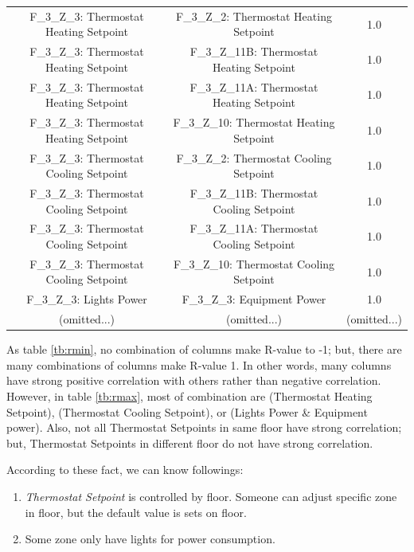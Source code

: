 \documentclass[aps, 10pt, a4paper]{article}
\begin{document}
\begin{table}[htbp]
\begin{tabular}{c|c||c}
                        F\_3\_Z\_3: Thermostat Heating Setpoint & F\_3\_Z\_2: Thermostat Heating Setpoint & 1.0 \\
                        F\_3\_Z\_3: Thermostat Heating Setpoint & F\_3\_Z\_11B: Thermostat Heating Setpoint & 1.0 \\
                        F\_3\_Z\_3: Thermostat Heating Setpoint & F\_3\_Z\_11A: Thermostat Heating Setpoint & 1.0 \\
                        F\_3\_Z\_3: Thermostat Heating Setpoint & F\_3\_Z\_10: Thermostat Heating Setpoint & 1.0 \\
                        F\_3\_Z\_3: Thermostat Cooling Setpoint & F\_3\_Z\_2: Thermostat Cooling Setpoint & 1.0 \\
                        F\_3\_Z\_3: Thermostat Cooling Setpoint & F\_3\_Z\_11B: Thermostat Cooling Setpoint & 1.0 \\
                        F\_3\_Z\_3: Thermostat Cooling Setpoint & F\_3\_Z\_11A: Thermostat Cooling Setpoint & 1.0 \\
                        F\_3\_Z\_3: Thermostat Cooling Setpoint & F\_3\_Z\_10: Thermostat Cooling Setpoint & 1.0 \\
                        F\_3\_Z\_3: Lights Power & F\_3\_Z\_3: Equipment Power & 1.0 \\
                        (omitted...) & (omitted...) &  (omitted...) \\
                    \end{tabular}
                \end{table}
                
                As table \ref{tb:rmin}, no combination of columns make R-value to -1;  but, there are many combinations of columns make R-value 1. In other words, many columns have strong positive correlation with others rather than negative correlation. However, in table \ref{tb:rmax}, most of combination are (Thermostat Heating Setpoint), (Thermostat Cooling Setpoint), or (Lights Power \& Equipment power). Also, not all Thermostat Setpoints in same floor have strong correlation; but, Thermostat Setpoints in different floor do not have strong correlation. 
                
                According to these fact, we can know followings:
                \begin{enumerate}
                    \item \textit{Thermostat Setpoint} is controlled by floor. Someone can adjust specific zone in floor, but the default value is sets on floor. 
                    \item Some zone only have lights for power consumption. 
                \end{enumerate}
                
\end{document}
